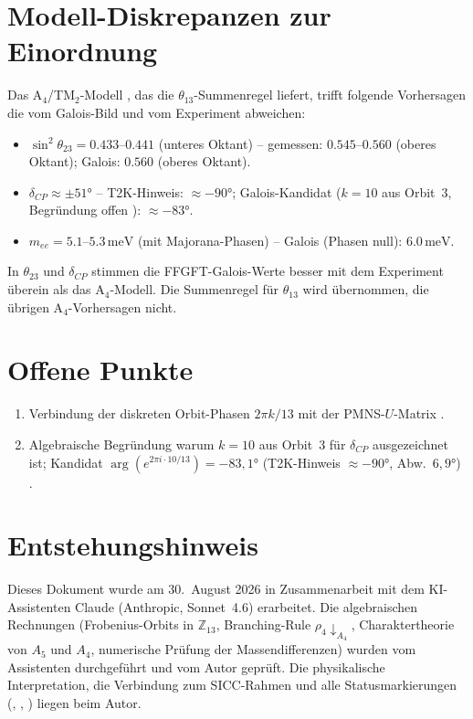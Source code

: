 \section{Modell-Diskrepanzen zur Einordnung \SM}

Das A$_4$/TM$_2$-Modell \cite{Razzaghi2022}, das die
$\theta_{13}$-Summenregel liefert, trifft folgende Vorhersagen
die vom Galois-Bild und vom Experiment abweichen:
\begin{itemize}
\item $\sin^2\theta_{23}=0.433$--$0.441$ (unteres Oktant) --
  gemessen: $0.545$--$0.560$ (oberes Oktant); Galois: $0.560$ (oberes Oktant).
\item $\delta_{CP}\approx\pm51°$ --
  T2K-Hinweis: $\approx-90°$; Galois-Kandidat ($k=10$ aus Orbit~3,
  Begründung offen \SM): $\approx-83°$.
\item $m_{ee}=5.1$--$5.3\,\text{meV}$ (mit Majorana-Phasen) --
  Galois (Phasen null): $6.0\,\text{meV}$.
\end{itemize}
In $\theta_{23}$ und $\delta_{CP}$ stimmen die
FFGFT-Galois-Werte besser mit dem Experiment überein als das
A$_4$-Modell. Die Summenregel für $\theta_{13}$ wird übernommen,
die übrigen A$_4$-Vorhersagen nicht.

\section{Offene Punkte}

\begin{enumerate}
\item Verbindung der diskreten Orbit-Phasen $2\pi k/13$ mit der
  PMNS-$U$-Matrix \SM.
\item Algebraische Begründung warum $k=10$ aus Orbit~3 für $\delta_{CP}$
  ausgezeichnet ist; Kandidat $\arg(e^{2\pi i\cdot10/13})=-83{,}1°$
  (T2K-Hinweis $\approx-90°$, Abw.\ $6{,}9°$) \SM.
\end{enumerate}

\section{Entstehungshinweis}

Dieses Dokument wurde am 30.~August 2026 in Zusammenarbeit mit dem
KI-Assistenten Claude (Anthropic, Sonnet~4.6) erarbeitet. Die algebraischen
Rechnungen (Frobenius-Orbits in $\mathbb{Z}_{13}$, Branching-Rule
$\rho_4\!\downarrow_{A_4}$, Charaktertheorie von $A_5$ und $A_4$,
numerische Prüfung der Massendifferenzen) wurden vom Assistenten
durchgeführt und vom Autor geprüft. Die physikalische Interpretation,
die Verbindung zum SICC-Rahmen und alle Statusmarkierungen
(\BM, \KM, \SM) liegen beim Autor.


